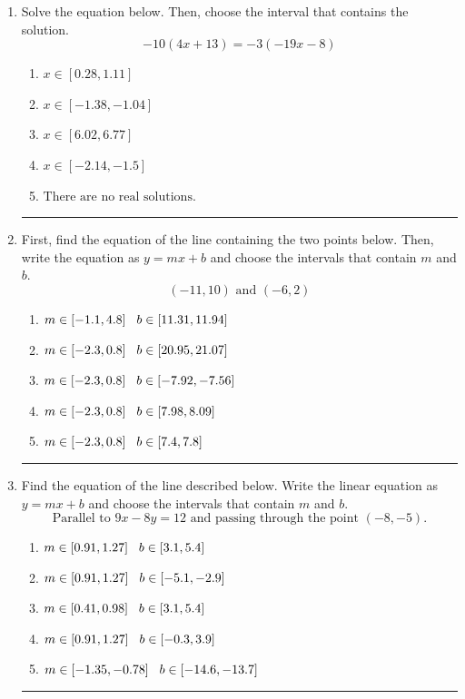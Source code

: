 \documentclass[14pt]{extbook}
\newcommand{\litem}[1]{\item#1\hspace*{-1cm}\rule{\textwidth}{0.4pt}}
\begin{document}
\begin{enumerate}
\litem{
Solve the equation below. Then, choose the interval that contains the solution.\[ -10(4x + 13) = -3(-19x -8) \]\begin{enumerate}[label=\Alph*.]
\item \( x \in [0.28, 1.11] \)
\item \( x \in [-1.38, -1.04] \)
\item \( x \in [6.02, 6.77] \)
\item \( x \in [-2.14, -1.5] \)
\item \( \text{There are no real solutions.} \)

\end{enumerate} }
\litem{
First, find the equation of the line containing the two points below. Then, write the equation as $ y=mx+b $ and choose the intervals that contain $m$ and $b$.\[ (-11, 10) \text{ and } (-6, 2) \]\begin{enumerate}[label=\Alph*.]
\item \( m \in [-1.1, 4.8] \hspace*{3mm} b \in [11.31, 11.94] \)
\item \( m \in [-2.3, 0.8] \hspace*{3mm} b \in [20.95, 21.07] \)
\item \( m \in [-2.3, 0.8] \hspace*{3mm} b \in [-7.92, -7.56] \)
\item \( m \in [-2.3, 0.8] \hspace*{3mm} b \in [7.98, 8.09] \)
\item \( m \in [-2.3, 0.8] \hspace*{3mm} b \in [7.4, 7.8] \)

\end{enumerate} }
\litem{
Find the equation of the line described below. Write the linear equation as $ y=mx+b $ and choose the intervals that contain $m$ and $b$.\[ \text{Parallel to } 9 x - 8 y = 12 \text{ and passing through the point } (-8, -5). \]\begin{enumerate}[label=\Alph*.]
\item \( m \in [0.91, 1.27] \hspace*{3mm} b \in [3.1, 5.4] \)
\item \( m \in [0.91, 1.27] \hspace*{3mm} b \in [-5.1, -2.9] \)
\item \( m \in [0.41, 0.98] \hspace*{3mm} b \in [3.1, 5.4] \)
\item \( m \in [0.91, 1.27] \hspace*{3mm} b \in [-0.3, 3.9] \)
\item \( m \in [-1.35, -0.78] \hspace*{3mm} b \in [-14.6, -13.7] \)


\end{enumerate}}
\end{enumerate}
\end{document}
